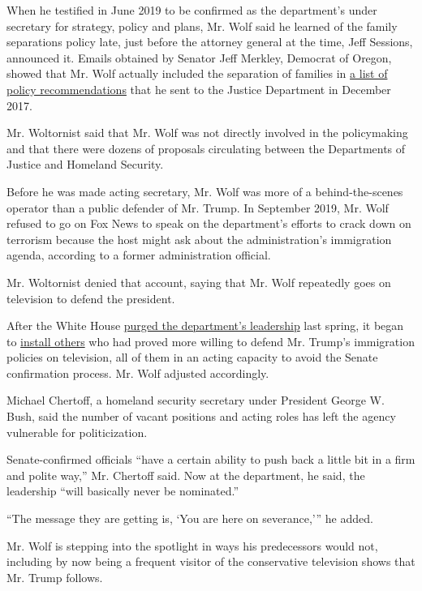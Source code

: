When he testified in June 2019 to be confirmed as the department's under
secretary for strategy, policy and plans, Mr. Wolf said he learned of
the family separations policy late, just before the attorney general at
the time, Jeff Sessions, announced it. Emails obtained by Senator Jeff
Merkley, Democrat of Oregon, showed that Mr. Wolf actually included the
separation of families in
\href{https://www.nbcnews.com/politics/immigration/watchdog-group-trump-dhs-pick-made-false-claims-about-role-n1078171}{a
list of policy recommendations} that he sent to the Justice Department
in December 2017.

Mr. Woltornist said that Mr. Wolf was not directly involved in the
policymaking and that there were dozens of proposals circulating between
the Departments of Justice and Homeland Security.

Before he was made acting secretary, Mr. Wolf was more of a
behind-the-scenes operator than a public defender of Mr. Trump. In
September 2019, Mr. Wolf refused to go on Fox News to speak on the
department's efforts to crack down on terrorism because the host might
ask about the administration's immigration agenda, according to a former
administration official.

Mr. Woltornist denied that account, saying that Mr. Wolf repeatedly goes
on television to defend the president.

After the White House
\href{https://www.nytimes3xbfgragh.onion/2019/04/08/us/politics/randolph-alles-secret-service.html}{purged
the department's leadership} last spring, it began to
\href{https://www.nytimes3xbfgragh.onion/2019/09/05/us/politics/ken-cuccinelli-immigration-trump.html}{install
others} who had proved more willing to defend Mr. Trump's immigration
policies on television, all of them in an acting capacity to avoid the
Senate confirmation process. Mr. Wolf adjusted accordingly.

Michael Chertoff, a homeland security secretary under President George
W. Bush, said the number of vacant positions and acting roles has left
the agency vulnerable for politicization.

Senate-confirmed officials ``have a certain ability to push back a
little bit in a firm and polite way,'' Mr. Chertoff said. Now at the
department, he said, the leadership ``will basically never be
nominated.''

``The message they are getting is, `You are here on severance,''' he
added.

Mr. Wolf is stepping into the spotlight in ways his predecessors would
not, including by now being a frequent visitor of the conservative
television shows that Mr. Trump follows.

